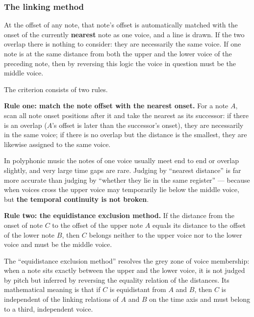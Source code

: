 \documentclass[11pt,a4paper]{article}
\begin{document}
\subsubsection{The linking method}
\label{subsec:line}

\begin{definition}
At the offset of any note, that note's offset is automatically matched with the onset
of the currently \textbf{nearest} note as one voice, and a line is drawn. If the two
overlap there is nothing to consider: they are necessarily the same voice. If one note
is at the same distance from both the upper and the lower voice of the preceding note,
then by reversing this logic the voice in question must be the middle voice.
\end{definition}

The criterion consists of two rules.

\textbf{Rule one: match the note offset with the nearest onset.} For a note $A$, scan
all note onset positions after it and take the nearest as its successor: if there is an
overlap ($A$'s offset is later than the successor's onset), they are necessarily in the
same voice; if there is no overlap but the distance is the smallest, they are likewise
assigned to the same voice.

\begin{remark}
In polyphonic music the notes of one voice usually meet end to end or overlap slightly,
and very large time gaps are rare. Judging by ``nearest distance'' is far more accurate
than judging by ``whether they lie in the same register'' --- because when voices cross
the upper voice may temporarily lie below the middle voice, but \textbf{the temporal
continuity is not broken}.
\end{remark}

\textbf{Rule two: the equidistance exclusion method.} If the distance from the onset of
note $C$ to the offset of the upper note $A$ equals its distance to the offset of the
lower note $B$, then $C$ belongs neither to the upper voice nor to the lower voice and
must be the middle voice.

\begin{observation}
The ``equidistance exclusion method'' resolves the grey zone of voice membership: when
a note sits exactly between the upper and the lower voice, it is not judged by pitch but
inferred by reversing the equality relation of the distances. Its mathematical meaning
is that if $C$ is equidistant from $A$ and $B$, then $C$ is independent of the linking
relations of $A$ and $B$ on the time axis and must belong to a third, independent voice.
\end{observation}
\end{document}
